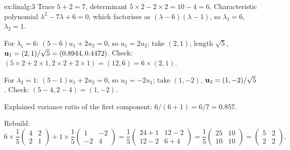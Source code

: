 \begin{solution}{ex:linalg:3}
Trace $5 + 2 = 7$, determinant $5\times2 - 2\times2 = 10 - 4 = 6$. Characteristic polynomial
$\lambda^2 - 7\lambda + 6 = 0$, which factorises as $(\lambda - 6)(\lambda - 1)$, so
$\lambda_1 = 6$, $\lambda_2 = 1$.

For $\lambda_1 = 6$: $(5 - 6)u_1 + 2u_2 = 0$, so $u_1 = 2u_2$; take $(2, 1)$, length $\sqrt5$,
$\mathbf{u}_1 = (2, 1)/\sqrt5 = (0.8944, 0.4472)$. Check: $(5\times2 + 2\times1, 2\times2 + 2\times1)
= (12, 6) = 6\times(2, 1)$.

For $\lambda_2 = 1$: $(5 - 1)u_1 + 2u_2 = 0$, so $u_2 = -2u_1$; take $(1, -2)$,
$\mathbf{u}_2 = (1, -2)/\sqrt5$. Check: $(5 - 4, 2 - 4) = (1, -2)$.

Explained variance ratio of the first component: $6/(6 + 1) = 6/7 = 0.857$.

Rebuild:
\[
6\times\frac15\begin{pmatrix} 4 & 2\\ 2 & 1\end{pmatrix} + 1\times\frac15\begin{pmatrix} 1 & -2\\ -2
& 4\end{pmatrix} = \frac15\begin{pmatrix} 24 + 1 & 12 - 2\\ 12 - 2 & 6 + 4\end{pmatrix}
= \frac15\begin{pmatrix} 25 & 10\\ 10 & 10\end{pmatrix} = \begin{pmatrix} 5 & 2\\ 2 & 2\end{pmatrix}.
\]
\end{solution}

